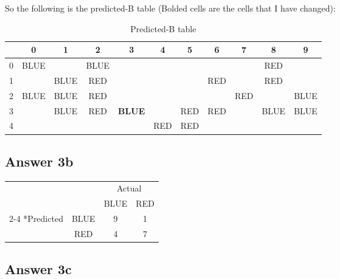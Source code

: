 \documentclass[
  11pt, %
]{assignment}
\begin{document}
So the following is the predicted-B table (Bolded cells are the cells that I have changed):

\begin{table}[h]
	\begin{center}
		\begin{tabular}{c | c | c | c | c | c | c | c | c | c | c}
			  & 0    & 1    & 2    & 3             & 4   & 5   & 6   & 7   & 8    & 9    \\
			\midrule
			0 & BLUE &      & BLUE &               &     &     &     &     & RED  &      \\
			\midrule
			1 &      & BLUE & RED  &               &     &     & RED &     & RED  &      \\
			\midrule
			2 & BLUE & BLUE & RED  &               &     &     &     & RED &      & BLUE \\
			\midrule
			3 &      & BLUE & RED  & \textbf{BLUE} &     & RED & RED &     & BLUE & BLUE \\
			\midrule
			4 &      &      &      &               & RED & RED &     &     &      &      \\
		\end{tabular}
	\end{center}
	\caption{Predicted-B table}\label{fig:predicted-b}
\end{table}

\subsection*{Answer 3b}

\begin{center}
	\begin{tabular}{c  c  c  c}
		                         &                           & \multicolumn{2}{c}{Actual}                           \\
		                         & \multicolumn{1}{c|}{}     & \multicolumn{1}{c}{BLUE}   & \multicolumn{1}{c}{RED} \\
		\cline{2-4}
		\multirow{2}*{Predicted} & \multicolumn{1}{c|}{BLUE} & \multicolumn{1}{c}{9}      & \multicolumn{1}{c}{1}   \\
		                         & \multicolumn{1}{c|}{RED}  & \multicolumn{1}{c}{4}      & \multicolumn{1}{c}{7}   \\
	\end{tabular}
\end{center}

\subsection*{Answer 3c}
\end{document}
